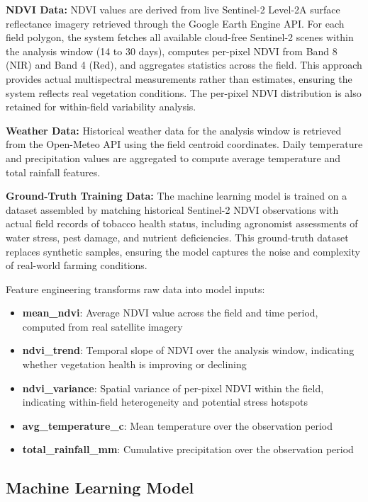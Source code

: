 \documentclass[journal]{IEEEtran}
\begin{document}
\textbf{NDVI Data:} NDVI values are derived from live Sentinel-2 Level-2A surface reflectance imagery retrieved through the Google Earth Engine API. For each field polygon, the system fetches all available cloud-free Sentinel-2 scenes within the analysis window (14 to 30 days), computes per-pixel NDVI from Band 8 (NIR) and Band 4 (Red), and aggregates statistics across the field. This approach provides actual multispectral measurements rather than estimates, ensuring the system reflects real vegetation conditions. The per-pixel NDVI distribution is also retained for within-field variability analysis.

\textbf{Weather Data:} Historical weather data for the analysis window is retrieved from the Open-Meteo API using the field centroid coordinates. Daily temperature and precipitation values are aggregated to compute average temperature and total rainfall features.

\textbf{Ground-Truth Training Data:} The machine learning model is trained on a dataset assembled by matching historical Sentinel-2 NDVI observations with actual field records of tobacco health status, including agronomist assessments of water stress, pest damage, and nutrient deficiencies. This ground-truth dataset replaces synthetic samples, ensuring the model captures the noise and complexity of real-world farming conditions.

Feature engineering transforms raw data into model inputs:

\begin{itemize}
\item \textbf{mean\_ndvi}: Average NDVI value across the field and time period, computed from real satellite imagery
\item \textbf{ndvi\_trend}: Temporal slope of NDVI over the analysis window, indicating whether vegetation health is improving or declining
\item \textbf{ndvi\_variance}: Spatial variance of per-pixel NDVI within the field, indicating within-field heterogeneity and potential stress hotspots
\item \textbf{avg\_temperature\_c}: Mean temperature over the observation period
\item \textbf{total\_rainfall\_mm}: Cumulative precipitation over the observation period
\end{itemize}

\subsection{Machine Learning Model}
\end{document}
